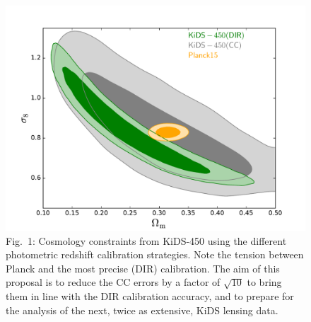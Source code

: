 \documentclass{article}[11pt]
\begin{document}
\begin{figure}
 \begin{minipage}[c]{0.6\textwidth}
  \includegraphics[width=\textwidth]{banana_DIR_vs_CC_vs_Planck.pdf}
  \end{minipage}\hfill
  \begin{minipage}[c]{0.5\textwidth}
    \caption*{Fig.~1: Cosmology constraints from KiDS-450 using the different photometric redshift calibration strategies. Note the tension between Planck and the most precise (DIR) calibration. The aim of this proposal is to reduce the CC errors by a factor of $\sqrt{10}$ to bring them in line with the DIR calibration accuracy, and to prepare for the analysis of the next, twice as extensive, KiDS lensing data.}
  \end{minipage}
\end{figure}
\end{document}
